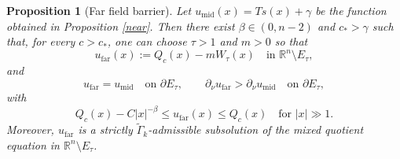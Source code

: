 \documentclass[reqno,a4paper]{amsart}
\numberwithin{equation}{section}
\newtheorem{proposition}{Proposition}[section]
\begin{document}
	\begin{proposition}[Far field barrier]
		Let $u_{\mathrm{mid}}(x) = Ts(x) + \gamma$ be the function obtained in Proposition \ref{near}. 
		Then there exist $\beta \in (0, n-2)$ and $c_* > \gamma$ such that, for every $c > c_*$, 
		one can choose $\tau > 1$ and $m > 0$ so that
		\[
		u_{\mathrm{far}}(x) := Q_c(x) - mW_{\tau}(x) \quad \text{in } \mathbb{R}^n \setminus E_{\tau},
		\]
		and
		\[
		u_{\mathrm{far}} = u_{\mathrm{mid}} \quad \text{on } \partial E_{\tau}, \qquad
		\partial_{\nu} u_{\mathrm{far}} > \partial_{\nu} u_{\mathrm{mid}} \quad \text{on } \partial E_{\tau},
		\]
		with
		\[
		Q_c(x) - C|x|^{-\beta} \le u_{\mathrm{far}}(x) \le Q_c(x) \quad \text{for } |x| \gg 1.
		\]
		Moreover, $u_{\mathrm{far}}$ is a strictly $\widetilde{\Gamma}_k$-admissible subsolution of the mixed quotient equation in $\mathbb{R}^n \setminus E_{\tau}$.
	\end{proposition}
	
\end{document}
